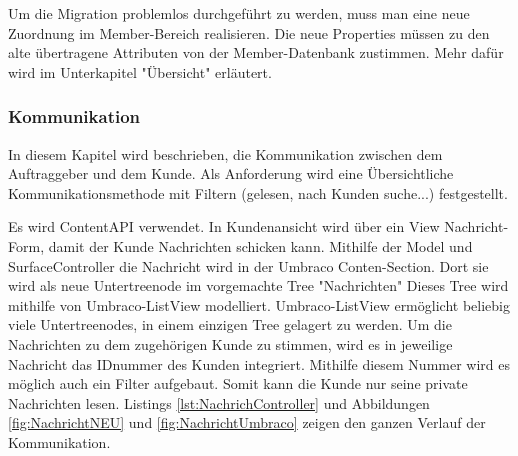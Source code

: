 Um die Migration problemlos durchgeführt zu werden, muss man eine neue Zuordnung im Member-Bereich realisieren. Die neue Properties müssen zu den alte übertragene Attributen von der Member-Datenbank zustimmen. Mehr dafür wird im Unterkapitel "Übersicht" erläutert.  
\subsubsection{Kommunikation}

In diesem Kapitel wird beschrieben, die Kommunikation zwischen dem Auftraggeber und dem Kunde. Als Anforderung wird eine Übersichtliche Kommunikationsmethode mit Filtern (gelesen, nach Kunden suche...) festgestellt.

Es wird ContentAPI \cite{UmbracoHQContent2018} verwendet. In Kundenansicht wird über ein View Nachricht-Form, damit der Kunde Nachrichten schicken kann. Mithilfe der Model und SurfaceController die Nachricht wird in der Umbraco Conten-Section. Dort sie wird als neue Untertreenode im vorgemachte Tree "Nachrichten" Dieses Tree wird mithilfe von Umbraco-ListView modelliert. Umbraco-ListView ermöglicht beliebig viele Untertreenodes, in einem einzigen Tree gelagert zu werden. Um die Nachrichten zu dem zugehörigen Kunde zu stimmen, wird es in jeweilige Nachricht das IDnummer des Kunden integriert. Mithilfe diesem Nummer wird es möglich auch ein Filter aufgebaut. Somit kann die Kunde nur seine private Nachrichten lesen. Listings \ref{lst:NachrichController} und Abbildungen \ref{fig:NachrichtNEU} und \ref{fig:NachrichtUmbraco} zeigen den ganzen Verlauf der Kommunikation.

